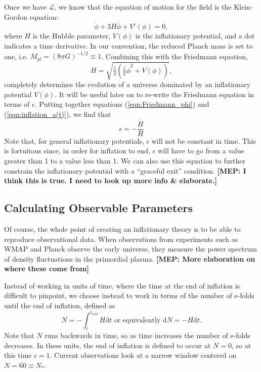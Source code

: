 \documentclass[a4paper,11pt]{article}
\def\d{\mathrm{d}}
\def\L{\mathscr{L}}
\def\half{\tfrac{1}{2}}
\newcommand{\mep}[1]{{\color{applegreen} \textbf{[MEP:  #1]}}}
\begin{document}
Once we have $\L$, we know that the equation of motion for the field is the Klein-Gordon equation:
\begin{equation}
\ddot \phi + 3H \dot \phi + V'(\phi) = 0,
\label{eqn:KG}
\end{equation}
where $H$ is the Hubble parameter, $V(\phi)$ is the inflationary potential, and a dot indicates a time derivative. In our convention, the reduced Planck mass is set to one, i.e. $M_{pl} = (8\pi G)^{-1/2} \equiv 1$. Combining this with the Friedmann equation, 
\begin{equation}
H = \sqrt{\tfrac{1}{3} \left ( \half \dot \phi^2 + V(\phi) \right )},
\label{eqn:Friedmann}
\end{equation}
completely determines the evolution of a universe dominated by an inflationary potential $V(\phi)$. It will be useful later on to re-write the Friedmann equation in terms of $\epsilon$. Putting together equations (\ref{eqn:Friedmann_phi}) and (\ref{eqn:inflation_a(t)}), we find that
\begin{equation}
\epsilon = -\frac{\dot H}{H}
\label{eqn:Friedmann_epsilon}
\end{equation}
Note that, for general inflationary potentials, $\epsilon$ will not be constant in time. This is fortuitous since, in order for inflation to end, $\epsilon$ will have to go from a value greater than 1 to a value less than 1. We can also use this equation to further constrain the inflationary potential with a ``graceful exit'' condition. \mep{I think this is true. I need to look up more info \& elaborate.}

\subsection{Calculating Observable Parameters}
Of course, the whole point of creating an inflationary theory is to be able to reproduce observational data. When observations from experiments such as WMAP and Planck observe the early universe, they measure the power spectrum of density fluctuations in the primordial plasma. \mep{More elaboration on where these come from}

Instead of working in units of time, where the time at the end of inflation is difficult to pinpoint, we choose instead to work in terms of the number of e-folds until the end of inflation, defined as 
\begin{equation}
N = -\int_t^{t_{end}} H \d t \text{\ \ \ or\ equivalently\ \ \ } \d N = -H \d t. 
\label{eqn:defN}
\end{equation}
Note that $N$ runs backwards in time, so as time increases the number of e-folds decreases. In these units, the end of inflation is defined to occur at $N=0$, so at this time $\epsilon=1$. Current observations look at a narrow window centered on $N=60\equiv N_*$.  
\end{document}
